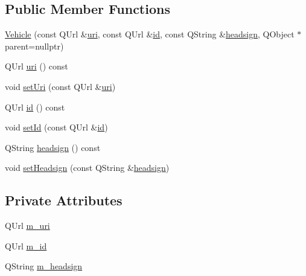 \subsection*{Public Member Functions}
\begin{DoxyCompactItemize}
\item 
\mbox{\hyperlink{classCSA_1_1Vehicle_a3697b0944b1b62366b0ab4b3011ff60f}{Vehicle}} (const Q\+Url \&\mbox{\hyperlink{classCSA_1_1Vehicle_a580c5dc0cf95552ae0dc20cfdb04d84a}{uri}}, const Q\+Url \&\mbox{\hyperlink{classCSA_1_1Vehicle_a99b2869ea0bee81d0bff5e32259146e6}{id}}, const Q\+String \&\mbox{\hyperlink{classCSA_1_1Vehicle_a7d8e773759fc99129669be053a731e95}{headsign}}, Q\+Object $\ast$parent=nullptr)
\item 
Q\+Url \mbox{\hyperlink{classCSA_1_1Vehicle_a580c5dc0cf95552ae0dc20cfdb04d84a}{uri}} () const
\item 
void \mbox{\hyperlink{classCSA_1_1Vehicle_a8988c6bd084f1385695d73ad80ffd67b}{set\+Uri}} (const Q\+Url \&\mbox{\hyperlink{classCSA_1_1Vehicle_a580c5dc0cf95552ae0dc20cfdb04d84a}{uri}})
\item 
Q\+Url \mbox{\hyperlink{classCSA_1_1Vehicle_a99b2869ea0bee81d0bff5e32259146e6}{id}} () const
\item 
void \mbox{\hyperlink{classCSA_1_1Vehicle_a65c6be2cd36fd59ba454e105452be1ee}{set\+Id}} (const Q\+Url \&\mbox{\hyperlink{classCSA_1_1Vehicle_a99b2869ea0bee81d0bff5e32259146e6}{id}})
\item 
Q\+String \mbox{\hyperlink{classCSA_1_1Vehicle_a7d8e773759fc99129669be053a731e95}{headsign}} () const
\item 
void \mbox{\hyperlink{classCSA_1_1Vehicle_ab47b72449154d72055cf506b6fc9a90a}{set\+Headsign}} (const Q\+String \&\mbox{\hyperlink{classCSA_1_1Vehicle_a7d8e773759fc99129669be053a731e95}{headsign}})
\end{DoxyCompactItemize}
\subsection*{Private Attributes}
\begin{DoxyCompactItemize}
\item 
Q\+Url \mbox{\hyperlink{classCSA_1_1Vehicle_a9ac31c6900099e172d8eae31f04849e4}{m\+\_\+uri}}
\item 
Q\+Url \mbox{\hyperlink{classCSA_1_1Vehicle_ac1d751db24a92a8b38efae09d7759fc8}{m\+\_\+id}}
\item 
Q\+String \mbox{\hyperlink{classCSA_1_1Vehicle_ab6764acaa95b5493b276e28a179952fd}{m\+\_\+headsign}}
\end{DoxyCompactItemize}


